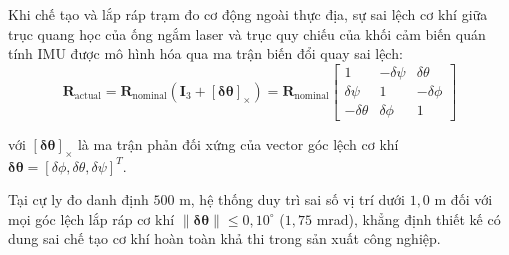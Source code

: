 \hspace{0.5cm} Khi chế tạo và lắp ráp trạm đo cơ động ngoài thực địa, sự sai lệch cơ khí giữa trục quang học của ống ngắm laser và trục quy chiếu của khối cảm biến quán tính IMU được mô hình hóa qua ma trận biến đổi quay sai lệch:
\begin{equation}
\mathbf{R}_{\text{actual}} = \mathbf{R}_{\text{nominal}} \left( \mathbf{I}_3 + [\boldsymbol{\delta\theta}]_\times \right) = \mathbf{R}_{\text{nominal}} \begin{bmatrix}
1 & -\delta\psi & \delta\theta \\
\delta\psi & 1 & -\delta\phi \\
-\delta\theta & \delta\phi & 1
\end{bmatrix}
\label{eq:boresighting-dcm-perturbation}
\end{equation}

với $[\boldsymbol{\delta\theta}]_\times$ là ma trận phản đối xứng của vector góc lệch cơ khí $\boldsymbol{\delta\theta} = [\delta\phi, \delta\theta, \delta\psi]^T$.

\begin{table}[H]
\centering
\caption{Đo đạc độ nhạy sai số vị trí theo góc lệch căn chỉnh cơ khí tại các cự ly quan sát}
\label{tab:boresighting-distance-sensitivity-table}
\end{table}

Tại cự ly đo danh định $500$ m, hệ thống duy trì sai số vị trí dưới $1{,}0$ m đối với mọi góc lệch lắp ráp cơ khí $\|\boldsymbol{\delta\theta}\| \le 0{,}10^\circ$ ($1{,}75$ mrad), khẳng định thiết kế có dung sai chế tạo cơ khí hoàn toàn khả thi trong sản xuất công nghiệp.

